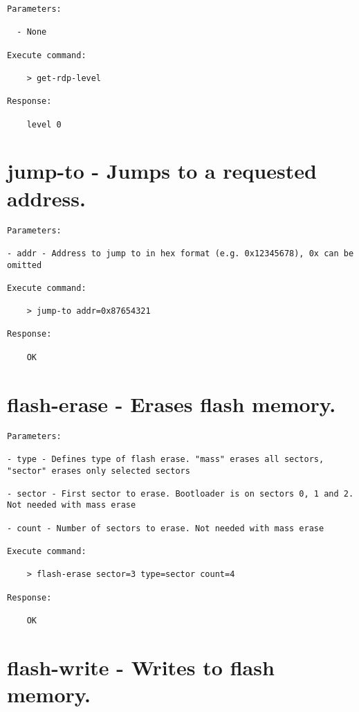 \begin{lstlisting}
Parameters:

  - None

Execute command: 

    > get-rdp-level  
    
Response: 

    level 0
\end{lstlisting}
    
\section{jump-to - Jumps to a requested address.}
\label{bl_cmd:jump-to}

\begin{lstlisting}
Parameters:

- addr - Address to jump to in hex format (e.g. 0x12345678), 0x can be omitted

Execute command: 

    > jump-to addr=0x87654321 
     
Response: 

    OK
\end{lstlisting}
     
\section{flash-erase - Erases flash memory.}
\label{bl_cmd:flash-erase}

\begin{lstlisting}
Parameters:

- type - Defines type of flash erase. "mass" erases all sectors, "sector" erases only selected sectors
    
- sector - First sector to erase. Bootloader is on sectors 0, 1 and 2. Not needed with mass erase
    
- count - Number of sectors to erase. Not needed with mass erase

Execute command: 

    > flash-erase sector=3 type=sector count=4 
     
Response: 

    OK
\end{lstlisting}

\section{flash-write - Writes to flash memory.}
\label{bl_cmd:flash-write}

